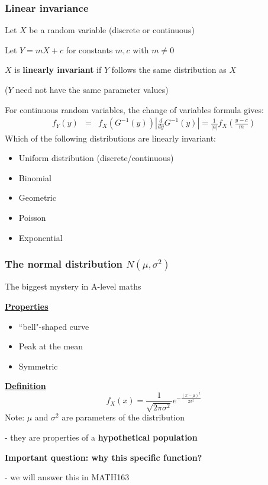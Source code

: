 \documentclass[t,8pt]{beamer}%
\begin{document}
\begin{frame}
	\frametitle{Linear invariance}
	Let $X$ be a random variable (discrete or continuous) \par
    Let $Y=mX+c$ for constants $m,c$ with $m\neq 0$ \par
    $X$ is {\bf linearly invariant} if $Y$ follows the same distribution as $X$ \par
    ($Y$ need not have the same parameter values) \par
    For continuous random variables, the change of variables formula gives:
    \begin{eqnarray*}
        f_Y(y)&=&f_X(G^{-1}(y))\left|\frac {d}{dy}G^{-1}(y)\right|=\frac 1{|a|}f_X\left(\frac{y-c}m\right)
    \end{eqnarray*}
    Which of the following distributions are linearly invariant:
    \begin{itemize}
        \item Uniform distribution (discrete/continuous)
        \item Binomial
        \item Geometric
        \item Poisson
        \item Exponential
    \end{itemize}
\end{frame}

\begin{frame}
	\frametitle{The normal distribution $N(\mu,\sigma^2)$}
	The biggest mystery in A-level maths \par
	{\bf\underline{Properties}} \par
	\begin{itemize}
		\item ``bell"-shaped curve
		\item Peak at the mean
		\item Symmetric
	\end{itemize}
	{\bf\underline{Definition}}
	$$f_X(x)=\frac 1{\sqrt{2\pi\sigma^2}}e^{-\frac{(x-\mu)^2}{2\sigma^2}}$$
        Note: $\mu$ and $\sigma^2$ are parameters of the distribution \par
        - they are properties of a {\bf hypothetical population} \par
	{\bf Important question: why this specific function?} \par
	- we will answer this in MATH163
\end{frame}
\end{document}
